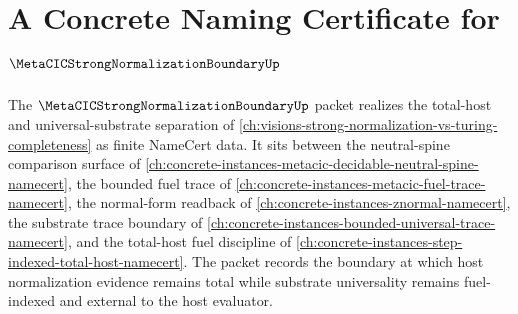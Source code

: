 \chapter{A Concrete Naming Certificate for $\MetaCICStrongNormalizationBoundaryUp$}
\label{ch:concrete-instances-metacic-strong-normalization-boundary-namecert}

The $\MetaCICStrongNormalizationBoundaryUp$ packet realizes the total-host and universal-substrate separation of \autoref{ch:visions-strong-normalization-vs-turing-completeness} as finite NameCert data. It sits between the neutral-spine comparison surface of \autoref{ch:concrete-instances-metacic-decidable-neutral-spine-namecert}, the bounded fuel trace of \autoref{ch:concrete-instances-metacic-fuel-trace-namecert}, the normal-form readback of \autoref{ch:concrete-instances-znormal-namecert}, the substrate trace boundary of \autoref{ch:concrete-instances-bounded-universal-trace-namecert}, and the total-host fuel discipline of \autoref{ch:concrete-instances-step-indexed-total-host-namecert}. The packet records the boundary at which host normalization evidence remains total while substrate universality remains fuel-indexed and external to the host evaluator.

